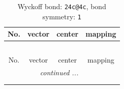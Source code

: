 \documentclass[fleqn,8pt]{jsarticle}
\begin{document}
\renewcommand{\arraystretch}{1.2}
\begin{longtable}{cccc}
\caption{Wyckoff bond: {\tt 24c@4c}, bond symmetry: {\tt 1}}
 \\
 \hline \hline
No. & vector & center & mapping \\ \hline \endfirsthead

\multicolumn{3}{l}{\tablename\ \thetable{}} \\
 \hline \hline
No. & vector & center & mapping \\ \hline \endhead

 \hline \hline
\multicolumn{3}{r}{\footnotesize\it continued ...} \\ \endfoot

 \hline \hline
\multicolumn{3}{r}{} \\ \endlastfoot


\end{longtable}
\end{document}
